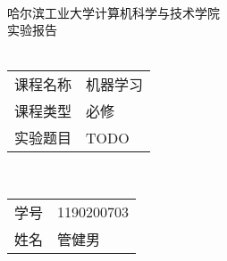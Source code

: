 \begin{center}
    \quad \vspace{3cm} \\
    \Large
    哈尔滨工业大学计算机科学与技术学院 \\
    
    \Huge
    实验报告 \\
    \quad \vspace{1cm} \\
    
    \Large
    \begin{tabular}{r@{：}l}
        课程名称 & 机器学习 \\
        课程类型 & 必修 \\
        实验题目 & TODO \\
    \end{tabular}
    \quad \vspace{1cm} \\
    
    \large
    \begin{tabular}{r@{：}l}
    学号 & 1190200703 \\
    姓名 & 管健男 \\
    \end{tabular}

\end{center}

